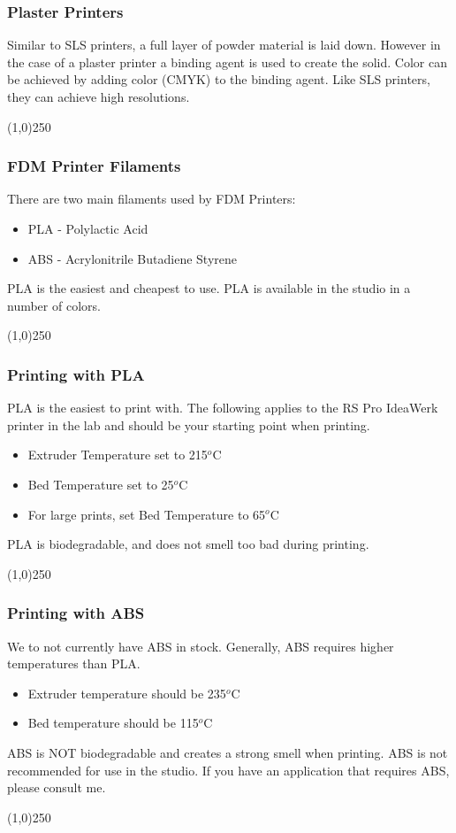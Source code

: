 \begin{frame}
\frametitle{Plaster Printers}
Similar to SLS printers, a full layer of powder material is laid down.  However in the case of a plaster printer a binding agent is used to create the solid.  Color can be achieved by adding color (CMYK) to the binding agent.  Like SLS printers, they can achieve high resolutions.
\end{frame}
\begin{center}\line(1,0){250}\end{center}


\begin{frame}
\frametitle{FDM Printer Filaments}
There are two main filaments used by FDM Printers:
\begin{itemize}
	\item PLA - Polylactic Acid
	\item ABS - Acrylonitrile Butadiene Styrene
\end{itemize}
PLA is the easiest and cheapest to use.  PLA is available in the studio in a number of colors. 
\end{frame}
\begin{center}\line(1,0){250}\end{center}

\begin{frame}
\frametitle{Printing with PLA}
PLA is the easiest to print with.  The following applies to the RS Pro IdeaWerk printer in the lab and should be your starting point when printing.
\begin{itemize}
	\item Extruder Temperature set to 215$^o$C
	\item Bed Temperature set to 25$^o$C
	\item For large prints, set Bed Temperature to 65$^o$C
\end{itemize}
PLA is biodegradable, and does not smell too bad during printing.
\end{frame}
\begin{center}\line(1,0){250}\end{center}


\begin{frame}
\frametitle{Printing with ABS}
We to not currently have ABS in stock.  Generally, ABS requires higher temperatures than PLA.
\begin{itemize}
	\item Extruder temperature should be  235$^o$C
	\item Bed temperature should be 115$^o$C
\end{itemize}
ABS is NOT biodegradable and creates a strong smell when printing.  ABS is not recommended for use in the studio.  If you have an application that requires ABS, please consult me.
\end{frame}
\begin{center}\line(1,0){250}\end{center}


